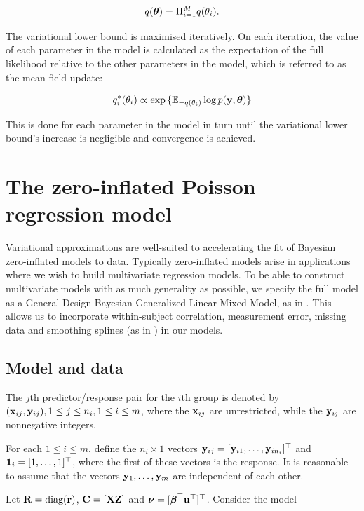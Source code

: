 \documentclass{article}[12pt]
\begin{document}
$$q({\boldsymbol \theta}) = \Pi_{i=1}^M q(\theta_i).$$

The variational lower bound is maximised iteratively. On each iteration, the value of each parameter in the
model is calculated as the expectation of the full likelihood relative to the other parameters in the model,
which is referred to as the mean field update:

$$q_i^*(\theta_i) \propto \exp{\{ {\mathbb E}_{-q(\theta_i)} \log p({\bf y}, {\boldsymbol\theta}) \}}$$

This is done for each parameter in the model in turn until the variational lower bound's increase is
negligible and convergence is achieved.

\section{The zero-inflated Poisson regression model}

Variational approximations are well-suited to accelerating the fit of Bayesian zero-inflated models to data.
Typically zero-inflated models arise in applications where we wish to build multivariate regression models. To
be able to construct multivariate models with as much generality as possible, we specify the full model as a
General Design Bayesian Generalized Linear Mixed Model, as in \citep{zhao06}. This allows us to incorporate
within-subject correlation, measurement error, missing data and smoothing splines (as in \cite{Wand2008}) in
our models.


\subsection{Model and data}

The $j$th predictor/response pair for the $i$th group is denoted by $({\bf x}_{ij}, {\bf y}_{ij}), 1 \leq j \leq n_i,
1 \leq i \leq m$, where the ${\bf x}_{ij}$ are unrestricted, while the ${\bf y}_{ij}$ are nonnegative integers.

For each $1 \leq i \leq m$, define the $n_i \times 1$ vectors ${\bf y}_{ij} = [{\bf y}_{i 1}, \ldots, {\bf y}_{i
n_i}]^\top$ and ${\bf 1}_i = [1, \ldots, 1]^\top$, where the first of these vectors is the response. It is
reasonable to assume that the vectors ${\bf y}_1, \ldots, {\bf y}_m$ are independent of each other.

Let ${\bf R} = \text{diag}{({\bf r})}$, ${\bf C} = [{\bf X} {\bf Z}]$ and ${\boldsymbol \nu} = [{\boldsymbol \beta}^\top {\bf u}^\top]^\top$. Consider the model
\end{document}
